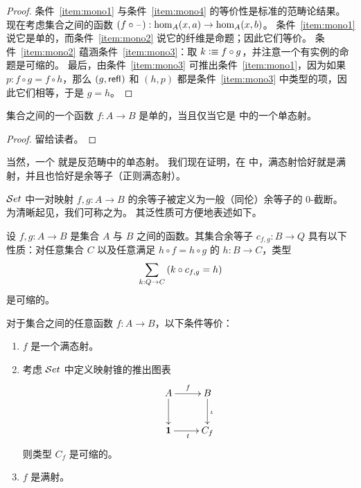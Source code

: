 \begin{proof}
  条件~\ref{item:mono1} 与条件~\ref{item:mono4} 的等价性是标准的范畴论结果。
  现在考虑集合之间的函数 $(f\circ \mathord{\hspace{1pt}\text{--}\hspace{1pt}} ):\hom_A(x,a) \to \hom_A(x,b)$。
  条件~\ref{item:mono1} 说它是单的，而条件~\ref{item:mono2} 说它的纤维是命题；因此它们等价。
  条件~\ref{item:mono2} 蕴涵条件~\ref{item:mono3}：取 $k\vcentcolon\equiv f\circ g$，并注意一个有实例的命题是可缩的。
  最后，由条件~\ref{item:mono3} 可推出条件~\ref{item:mono1}，因为如果 $p:f\circ g= f\circ h$，那么 $(g,\mathsf{refl}_{})$ 和 $(h,p)$ 都是条件~\ref{item:mono3} 中类型的项，因此它们相等，于是 $g=h$。
\end{proof}

\begin{lem}\label{thm:inj-mono}
  集合之间的一个函数 $f:A\to B$ 是单的，当且仅当它是 \uset 中的一个单态射。
\end{lem}

\begin{proof}
  留给读者。
\end{proof}

当然，一个
%
%
就是反范畴中的单态射。
我们现在证明，在 \uset 中，满态射恰好就是满射，并且也恰好是余等子（正则满态射）。

$\mathcal{S}et$ 中一对映射 $f,g:A\to B$ 的余等子被定义为一般（同伦）余等子的 0-截断。
为清晰起见，我们可称之为。
%
%
其泛性质可方便地表述如下。

\begin{lem}
%
设 $f,g:A\to B$ 是集合 $A$ 与 $B$ 之间的函数。其集合余等子 $c_{f,g}:B\to Q$ 具有以下性质：对任意集合 $C$ 以及任意满足 $h\circ f = h\circ g$ 的 $h:B\to C$，类型
\begin{equation*}
\sm{k:Q\to C} (k\circ c_{f,g} = h)
\end{equation*}
是可缩的。
\end{lem}

\begin{lem}\label{epis-surj}
对于集合之间的任意函数 $f:A\to B$，以下条件等价：
\begin{enumerate}
\item $f$ 是一个满态射。
\item 考虑 $\mathcal{S}et$ 中定义映射锥的推出图表
\begin{equation*}
  \xymatrix{
    {A}
    \ar[r]^{f}
    \ar[d]
    &
    {B}
    \ar[d]^{\iota}
    \\
    {\unit}
    \ar[r]_{t}
    &
    {C_f}
  }
\end{equation*}
则类型 $C_f$ 是可缩的。
\item $f$ 是满射。
\end{enumerate}
\end{lem}


